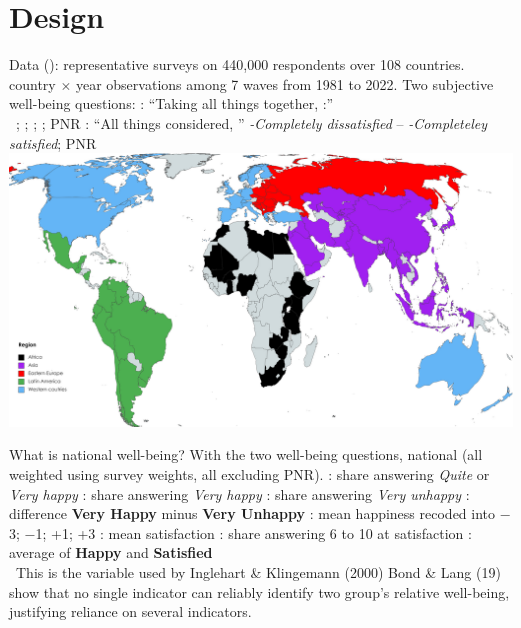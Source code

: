 \documentclass[aspectratio=169,xcolor=dvipsnames, 11pt,mathserif]{beamer}
\begin{document}
\section{Design}

\begin{frame}{Data}
    \bbvsp
    \ip {} (): representative surveys on 440,000 respondents over 108 countries.
     country $\times$ year observations among 7 waves from 1981 to 2022.
    \ip Two subjective well-being questions:
    \bbvsp 
    \ip {}: ``Taking all things together, :'' \\ ~\textit{}; \textit{}; \textit{}; \textit{}; PNR %
    \ip {}: ``All things considered, '' \textit{-Completely dissatisfied} -- \textit{-Completeley satisfied}; PNR %
    \ee
    \ee
    \centering \includegraphics[height=.5\textheight]{../figures/WVS_countries_regions}
\end{frame}

\begin{frame}{What is national well-being?}
    With the two well-being questions,  national  (all weighted using survey weights, all excluding PNR).
    \bbvsp
    \ip \textbf{}: share answering \textit{Quite} or \textit{Very happy}
    \ip \textbf{}: share answering \textit{Very happy}
    \ip \textbf{}: share answering \textit{Very unhappy}
    \ip \textbf{}: difference \textbf{Very Happy} minus \textbf{Very Unhappy}
    \ip \textbf{}: mean happiness recoded into $-$3; $-$1; +1; +3
    \ip \textbf{}: mean satisfaction
    \ip \textbf{}: share answering 6 to 10 at satisfaction
    \ip \textbf{}: average of \textbf{Happy} and \textbf{Satisfied}\\ ~\quad This is the variable used by Inglehart \& Klingemann (2000) %
    \ip Bond \& Lang (19) show that no single indicator can reliably identify two group's relative well-being, justifying reliance on several indicators.
    \ee 
\end{frame}
\end{document}
